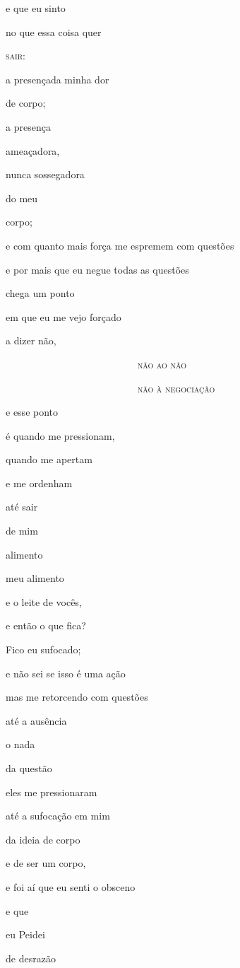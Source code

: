 e que eu sinto

no que essa coisa quer

\textsc{sair:}

a presençada minha dor

de corpo;

a presença

ameaçadora,

nunca sossegadora

do meu \EP[1]

corpo;

e com quanto mais força me espremem com questões

e por mais que eu negue todas as questões

chega um ponto

em que eu me vejo forçado

a dizer não,

~~~~~~~~~~~~~~~~~~~~~~~~~~ \textsc{não ao não}

~~~~~~~~~~~~~~~~~~~~~~~~~~ \textsc{não à negociação}


e esse ponto

é quando me pressionam,

quando me apertam

e me ordenham

até sair

de mim

alimento

meu alimento

e o leite de vocês,

e então o que fica?

Fico eu sufocado;

e não sei se isso é uma ação

mas me retorcendo com questões

até a ausência

o nada

da questão

eles me pressionaram

até a sufocação em mim

da ideia de corpo

e de ser um corpo,

e foi aí que eu senti o obsceno

e que

eu Peidei

de desrazão


